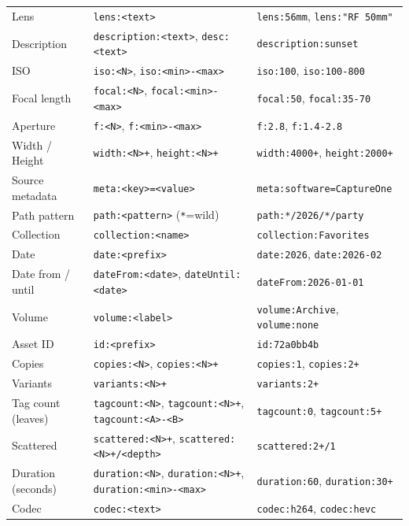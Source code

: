 \documentclass[a4paper,10pt]{extarticle}
\newcommand{\cmd}[1]{\texttt{#1}}
\begin{document}
\begin{tabularx}{\textwidth}{@{}l l X@{}}
Lens                & \cmd{lens:<text>}                     & \cmd{lens:56mm}, \cmd{lens:"RF 50mm"} \\
Description         & \cmd{description:<text>}, \cmd{desc:<text>} & \cmd{description:sunset} \\
ISO                 & \cmd{iso:<N>}, \cmd{iso:<min>-<max>}  & \cmd{iso:100}, \cmd{iso:100-800} \\
Focal length        & \cmd{focal:<N>}, \cmd{focal:<min>-<max>} & \cmd{focal:50}, \cmd{focal:35-70} \\
Aperture            & \cmd{f:<N>}, \cmd{f:<min>-<max>}      & \cmd{f:2.8}, \cmd{f:1.4-2.8} \\
Width / Height      & \cmd{width:<N>+}, \cmd{height:<N>+}   & \cmd{width:4000+}, \cmd{height:2000+} \\
Source metadata     & \cmd{meta:<key>=<value>}              & \cmd{meta:software=CaptureOne} \\
Path pattern        & \cmd{path:<pattern>} (\cmd{*}=wild)   & \cmd{path:*/2026/*/party} \\
Collection          & \cmd{collection:<name>}               & \cmd{collection:Favorites} \\
Date                & \cmd{date:<prefix>}                   & \cmd{date:2026}, \cmd{date:2026-02} \\
Date from / until   & \cmd{dateFrom:<date>}, \cmd{dateUntil:<date>} & \cmd{dateFrom:2026-01-01} \\
Volume              & \cmd{volume:<label>}                  & \cmd{volume:Archive}, \cmd{volume:none} \\
Asset ID            & \cmd{id:<prefix>}                     & \cmd{id:72a0bb4b} \\
Copies              & \cmd{copies:<N>}, \cmd{copies:<N>+}   & \cmd{copies:1}, \cmd{copies:2+} \\
Variants            & \cmd{variants:<N>+}                   & \cmd{variants:2+} \\
Tag count (leaves)  & \cmd{tagcount:<N>}, \cmd{tagcount:<N>+}, \cmd{tagcount:<A>-<B>} & \cmd{tagcount:0}, \cmd{tagcount:5+} \\
Scattered           & \cmd{scattered:<N>+}, \cmd{scattered:<N>+/<depth>} & \cmd{scattered:2+/1} \\
Duration (seconds)  & \cmd{duration:<N>}, \cmd{duration:<N>+}, \cmd{duration:<min>-<max>} & \cmd{duration:60}, \cmd{duration:30+} \\
Codec               & \cmd{codec:<text>}                    & \cmd{codec:h264}, \cmd{codec:hevc} \\

\end{tabularx}
\end{document}
